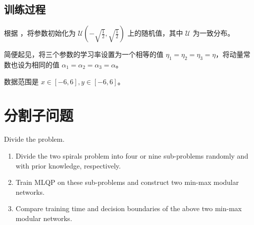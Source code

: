     \subsection{训练过程}

    根据 \cite{torchlinear}，将参数初始化为 $\mathcal{U}\left(-\sqrt{\frac{1}{2}},\sqrt{\frac{1}{2}}\right)$ 上的随机值，其中 $\mathcal{U}$ 为一致分布。

    简便起见，将三个参数的学习率设置为一个相等的值 $\eta_1=\eta_2=\eta_3=\eta$，将动量常数也设为相同的值 $\alpha_1=\alpha_2=\alpha_3=\alpha$。

    数据范围是 $x\in[-6,6],y\in[-6,6]$。

    \section{分割子问题}

    \begin{problem}
        Divide the problem.
        \begin{enumerate}
            \item Divide the two spirals problem into four or nine sub-problems randomly and with prior knowledge, respectively.
            \item Train MLQP on these sub-problems and construct two min-max modular networks.
            \item Compare training time and decision boundaries of the above two min-max modular networks.
        \end{enumerate}
    \end{problem}

    
